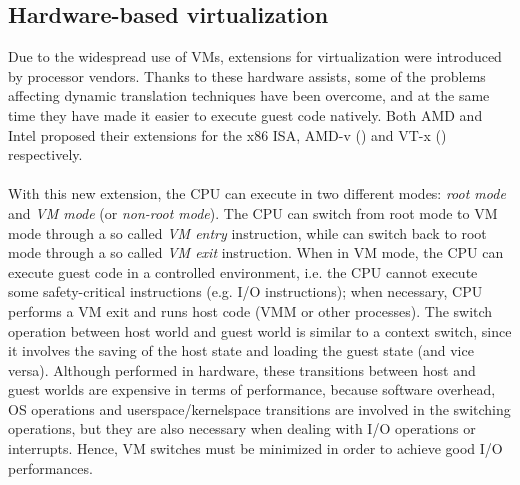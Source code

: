 \documentclass[a4paper, 12pt, titlepage]{report}
\begin{document}
\subsection{Hardware-based virtualization} \label{subsec:hw_virt}
Due to the widespread use of VMs, extensions for virtualization were introduced by processor vendors. Thanks to these hardware assists, some of the problems affecting dynamic translation techniques have been overcome, and at the same time they have made it easier to execute guest code natively. Both AMD and Intel proposed their extensions for the x86 ISA, AMD-v (\cite{amd-v}) and VT-x (\cite{vt-x}) respectively.
\\
\\
With this new extension, the CPU can execute in two different modes: \textit{root mode} and \textit{VM mode} (or \textit{non-root mode}). The CPU can switch from root mode to VM mode through a so called \textit{VM entry} instruction, while can switch back to root mode through a so called \textit{VM exit} instruction. When in VM mode, the CPU can execute guest code in a controlled environment, i.e. the CPU cannot execute some safety-critical instructions (e.g. I/O instructions); when necessary, CPU performs a VM exit and runs host code (VMM or other processes). The switch operation between host world and guest world is similar to a context switch, since it involves the saving of the host state and loading the guest state (and vice versa). Although performed in hardware, these transitions between host and guest worlds are expensive in terms of performance, because software overhead, OS operations and userspace/kernelspace transitions are involved in the switching operations, but they are also necessary when dealing with I/O operations or interrupts. Hence, VM switches must be minimized in order to achieve good I/O performances.
\end{document}
